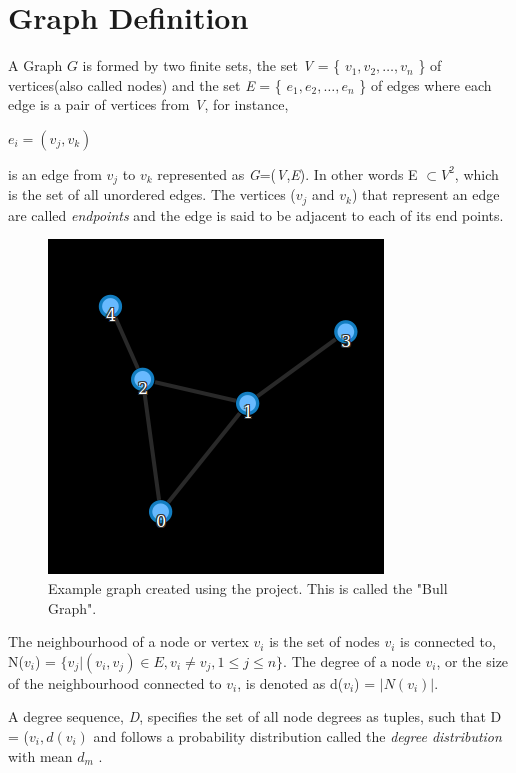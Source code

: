 \section{Graph Definition}
A Graph $G$ is formed by two finite sets, the set \textit{V} = \{ $v_1,v_2, \ldots ,v_n$ \} of vertices(also called nodes) and the set \textit{E} = \{ $e_1,e_2, \ldots,e_n$  \} of edges where each edge is a pair of vertices from \textit{V}, for instance,
\begin{center}
$e_i = (v_j,v_k)$
\end{center}
is an edge from $v_j$ to $v_k$ represented as \textit{G}=(\textit{V},\textit{E}). In other words  E $\subset V^2$, which is the set of all unordered edges. The vertices ($v_j$ and $v_k$) that represent an edge are called \textit{endpoints} and the edge is said to be adjacent to each of its end points.
\begin{figure}[h]
\centering
\includegraphics[scale=0.5]{bull.png}
\caption{Example graph created using the project. This is called the "Bull Graph".}
\end{figure}

The neighbourhood of a node or vertex $v_i$ is the set of
nodes $v_i$ is connected to, N($v_i$) = $\{v_j | (v_i, v_j) \in E, v_i \neq
v_j, 1 \leq j \leq n\}$. The degree of a node $v_i$, or the size of
the neighbourhood connected to $v_i$, is denoted as d($v_i$) =
$|N(v_i)|$. 
\par A degree sequence, \textit{D}, specifies the set of all node
degrees as tuples, such that D = {($v_i, d(v_i)$} and follows a
probability distribution called the \textit{degree distribution} with
mean $d_m$ \cite{githubtest1}.

